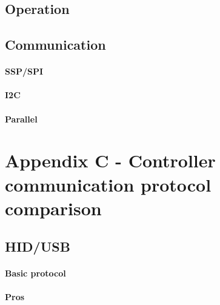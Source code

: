 \documentclass[a4paper,10pt]{article}
\begin{document}
\begin{multicols}{2}
\TODO


\subsection{Operation}

\TODO


\subsection{Communication}

\TODO


\paragraph{SSP/SPI}
\TODO


\paragraph{I2C}
\TODO


\paragraph{Parallel}
\TODO



\section{Appendix C - Controller communication protocol comparison}

\TODO


\subsection{HID/USB}

\TODO


\paragraph{Basic protocol}
\TODO


\paragraph{Pros}
\TODO



\end{multicols}
\end{document}
